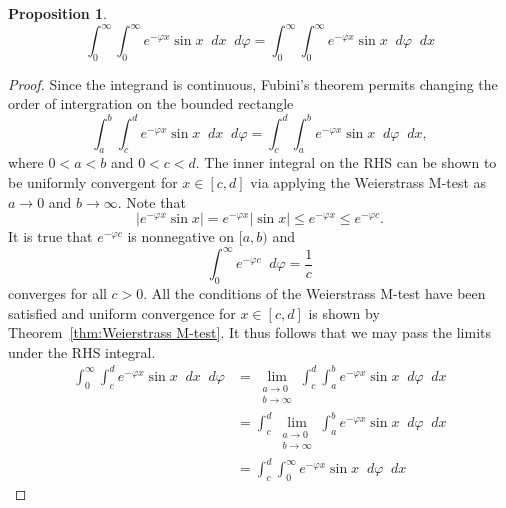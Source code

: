 \documentclass[a4paper]{article}
\newcommand*\diff{\mathop{}\!d} %
\newtheorem{proposition}[theorem]{Proposition}
\theoremstyle{definition}
\begin{document}
\begin{proposition} \label{thm:double integral proposition}
    \begin{equation*}
        \int_{0}^{\infty} \int_{0}^{\infty} e^{-\varphi x} \sin x \diff x \diff \varphi = \int_{0}^{\infty} \int_{0}^{\infty} e^{-\varphi x} \sin x  \diff \varphi \diff x
    \end{equation*}
\end{proposition}
\begin{proof}
    Since the integrand is continuous, Fubini's theorem permits changing the order of intergration on the bounded rectangle
    \begin{equation*}
        \int_{a}^{b} \int_{c}^{d} e^{-\varphi x} \sin x \diff x \diff \varphi = \int_{c}^{d} \int_{a}^{b} e^{-\varphi x} \sin x  \diff \varphi \diff x,
    \end{equation*}
    where $0 < a < b$ and $0 < c < d$.
    The inner integral on the RHS can be shown to be uniformly convergent for $x \in [c,d]$ via applying the Weierstrass M-test as $a \to 0$ and $b \to \infty$.
    Note that
    \begin{equation*}
        \left|e^{-\varphi x} \sin x \right| = e^{-\varphi x} |\sin x| \leq e^{-\varphi x} \leq e^{-\varphi c}.
    \end{equation*}
    It is true that $e^{-\varphi c}$ is nonnegative on $[a,b)$ and
    \begin{equation*}
        \int_{0}^{\infty} e^{-\varphi c} \diff \varphi = \frac{1}{c}
    \end{equation*}
    converges for all $c>0$.
    All the conditions of the Weierstrass M-test have been satisfied and uniform convergence for $x \in [c,d]$ is shown by Theorem~\ref{thm:Weierstrass M-test}.
    It thus follows that we may pass the limits under the RHS integral.
    \begin{align*}
        \int_{0}^{\infty} \int_{c}^{d} e^{-\varphi x} \sin x \diff x \diff \varphi & = \lim_{\substack{a \to 0                                                     \\ b \to \infty}} \int_{c}^{d} \int_{a}^{b} e^{-\varphi x} \sin x  \diff \varphi \diff x \\
                                                                                   & = \int_{c}^{d} \lim_{\substack{a \to 0                                        \\ b \to \infty}} \int_{a}^{b} e^{-\varphi x} \sin x  \diff \varphi \diff x \\
                                                                                   & = \int_{c}^{d} \int_{0}^{\infty} e^{-\varphi x} \sin x  \diff \varphi \diff x

\end{align*}
\end{proof}
\end{document}
